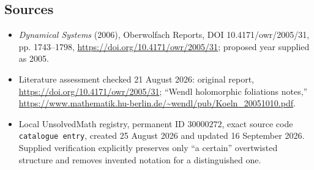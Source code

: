 \documentclass[11pt]{article}
\begin{document}
\subsection{Sources}
\begin{itemize}
\item \emph{Dynamical Systems} (2006), Oberwolfach Reports, DOI 10.4171/owr/2005/31, pp. 1743--1798, \url{https://doi.org/10.4171/owr/2005/31}; proposed year supplied as 2005.
\item Literature assessment checked 21 August 2026: original report, \url{https://doi.org/10.4171/owr/2005/31}; ``Wendl holomorphic foliations notes,'' \url{https://www.mathematik.hu-berlin.de/~wendl/pub/Koeln_20051010.pdf}.
\item Local UnsolvedMath registry, permanent ID $30000272$, exact source code \texttt{catalogue entry}, created 25 August 2026 and updated 16 September 2026. Supplied verification explicitly preserves only ``a certain'' overtwisted structure and removes invented notation for a distinguished one.
\end{itemize}
\end{document}
